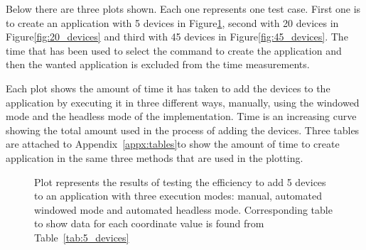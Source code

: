 Below there are three plots shown. Each one represents one test case. First one is to create an application with 5 devices in Figure\ref{fig:5_devices}, second with 20 devices in Figure\ref{fig:20_devices} and third with 45 devices in Figure\ref{fig:45_devices}.
The time that has been used to select the command to create the application and then the wanted application is excluded from the time measurements.

Each plot shows the amount of time it has taken to add the devices to the application by executing it in three different ways, manually, using the windowed mode and the headless mode of the implementation.
Time is an increasing curve showing the total amount used in the process of adding the devices.
Three tables are attached to Appendix~\ref{appx:tables}to show the amount of time to create application in the same three methods that are used in the plotting.

\begin{figure}[H]
\centering
{}

    \caption{Plot represents the results of testing the efficiency to add 5 devices to an application with three execution modes: manual, automated windowed mode and automated headless mode. Corresponding table to show data for each coordinate value is found from Table~\ref{tab:5_devices}}\label{fig:5_devices}
\end{figure}

